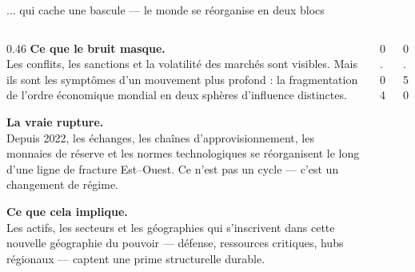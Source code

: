 \documentclass[aspectratio=169,9pt]{beamer}
\newcommand{\kw}[1]{{\color{navy}\footnotesize\bfseries #1}\\[3pt]}
\begin{document}
\begin{frame}{... qui cache une bascule — le monde se réorganise en deux blocs}
\vspace{4pt}
\begin{columns}[T,totalwidth=\textwidth]

\begin{column}{0.46\textwidth}
\kw{Ce que le bruit masque.}
{\small Les conflits, les sanctions et la volatilité des marchés sont
visibles. Mais ils sont les symptômes d'un mouvement plus profond :
la fragmentation de l'ordre économique mondial en deux sphères
d'influence distinctes.}

\vspace{5pt}
\kw{La vraie rupture.}
{\small Depuis 2022, les échanges, les chaînes d'approvisionnement,
les monnaies de réserve et les normes technologiques se réorganisent
le long d'une ligne de fracture Est–Ouest. Ce n'est pas un cycle —
c'est un changement de régime.}

\vspace{5pt}
\kw{Ce que cela implique.}
{\small Les actifs, les secteurs et les géographies qui s'inscrivent
dans cette nouvelle géographie du pouvoir — défense, ressources
critiques, hubs régionaux — captent une prime structurelle durable.}
\end{column}

\begin{column}{0.04\textwidth}\end{column}

\begin{column}{0.50\textwidth}
\vspace{4pt}
\end{column}
\end{columns}
\end{frame}
\end{document}
